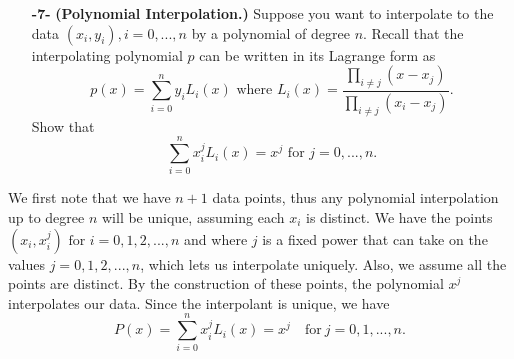 \documentclass[11pt]{article}
\theoremstyle{definition}
\newcommand{\1}[1]{\mathbf{1} \left \{ #1 \right \}}
\begin{document}
\begin{itemize}
    \item[{\textbf{-7-}}] \textbf{(Polynomial Interpolation.)}  Suppose you want to interpolate to the data $(x_i, y_i), i=0,..., n$ by a polynomial of degree $n$.  Recall that the interpolating polynomial $p$ can be written in its Lagrange form as
    \begin{equation}
        p(x) = \sum_{i=0}^n y_i L_i (x) \text{  where  } L_i (x) = \frac{\prod_{i \neq j}(x - x_j)}{\prod_{i \neq j}(x_i - x_j)}.
    \end{equation}
    Show that
    \begin{equation}
        \sum_{i=0}^n x_i^j L_i (x) = x^j \text{  for  } j=0,..., n.
    \end{equation}
\end{itemize}
We first note that we have $n+1$ data points, thus any polynomial interpolation up to degree $n$ will be unique, assuming each $x_i$ is distinct.  We have the points \(\left(x_i , x_i^j\right) \text{ for } i=0,1,2,...,n\) and where $j$ is a fixed power that can take on the values $j = 0,1,2,...,n$, which lets us interpolate uniquely.  Also, we assume all the points are distinct.  By the construction of these points, the polynomial $x^j$ interpolates our data.  Since the interpolant is unique, we have
\[P(x) = \sum_{i=0}^n x_i^j L_i (x) = x^j \quad \text{for} \ j = 0,1,...,n.\]
\end{document}
